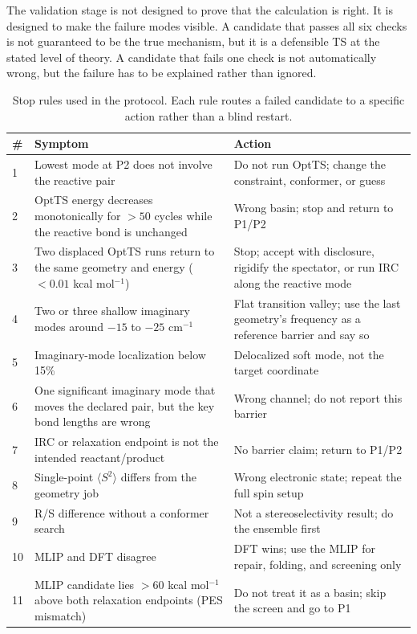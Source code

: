 \documentclass[11pt,a4paper]{article}
\begin{document}
The validation stage is not designed to prove that the calculation is right. It is designed to make the failure modes visible. A candidate that passes all six checks is not guaranteed to be the true mechanism, but it is a defensible TS at the stated level of theory. A candidate that fails one check is not automatically wrong, but the failure has to be explained rather than ignored.

\begin{table}[t]
\centering
\caption{Stop rules used in the protocol. Each rule routes a failed candidate to a specific action rather than a blind restart.}
\label{tab:stop}
\small
\begin{tabularx}{\linewidth}{@{}p{0.4cm}>{\raggedright\arraybackslash}X >{\raggedright\arraybackslash}X@{}}
\toprule
\# & Symptom & Action \\
\midrule
1 & Lowest mode at P2 does not involve the reactive pair & Do not run OptTS; change the constraint, conformer, or guess \\
2 & OptTS energy decreases monotonically for $>50$ cycles while the reactive bond is unchanged & Wrong basin; stop and return to P1/P2 \\
3 & Two displaced OptTS runs return to the same geometry and energy ($<0.01$ kcal mol$^{-1}$) & Stop; accept with disclosure, rigidify the spectator, or run IRC along the reactive mode \\
4 & Two or three shallow imaginary modes around $-15$ to $-25$ cm$^{-1}$ & Flat transition valley; use the last geometry's frequency as a reference barrier and say so \\
5 & Imaginary-mode localization below 15\% & Delocalized soft mode, not the target coordinate \\
6 & One significant imaginary mode that moves the declared pair, but the key bond lengths are wrong & Wrong channel; do not report this barrier \\
7 & IRC or relaxation endpoint is not the intended reactant/product & No barrier claim; return to P1/P2 \\
8 & Single-point $\langle S^2\rangle$ differs from the geometry job & Wrong electronic state; repeat the full spin setup \\
9 & R/S difference without a conformer search & Not a stereoselectivity result; do the ensemble first \\
10 & MLIP and DFT disagree & DFT wins; use the MLIP for repair, folding, and screening only \\
11 & MLIP candidate lies $>60$ kcal mol$^{-1}$ above both relaxation endpoints (PES mismatch) & Do not treat it as a basin; skip the screen and go to P1 \\
\bottomrule
\end{tabularx}
\end{table}
\end{document}
